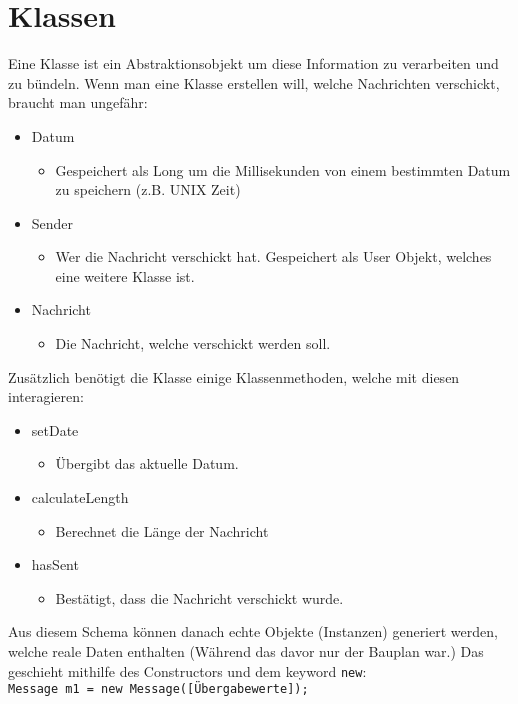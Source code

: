 \documentclass{article}
\begin{document}
	\section{Klassen}
	Eine Klasse ist ein Abstraktionsobjekt um diese Information zu verarbeiten und zu bündeln. Wenn man eine Klasse erstellen will, welche Nachrichten verschickt, braucht man ungefähr:
	\begin{itemize}
		\item{Datum}
		\begin{itemize}
			\item{Gespeichert als Long um die Millisekunden von einem bestimmten Datum zu speichern (z.B. UNIX Zeit)}
		\end{itemize}
		\item{Sender}
		\begin{itemize}
			\item{Wer die Nachricht verschickt hat. Gespeichert als User Objekt, welches eine weitere Klasse ist.}
		\end{itemize}
		\item{Nachricht}
		\begin{itemize}
			\item{Die Nachricht, welche verschickt werden soll.}
		\end{itemize}
	\end{itemize}
	Zusätzlich benötigt die Klasse einige Klassenmethoden, welche mit diesen interagieren:
	\begin{itemize}
		\item{setDate}
		\begin{itemize}
			\item{Übergibt das aktuelle Datum.}
		\end{itemize}
		\item{calculateLength}
		\begin{itemize}
			\item{Berechnet die Länge der Nachricht}
		\end{itemize}
		\item{hasSent}
		\begin{itemize}
			\item{Bestätigt, dass die Nachricht verschickt wurde.}
		\end{itemize}
	\end{itemize}
	Aus diesem Schema können danach echte Objekte (Instanzen) generiert werden, welche reale Daten enthalten (Während das davor nur der Bauplan war.) Das geschieht mithilfe des Constructors und dem keyword \texttt{new}: \\
	\texttt{Message m1 = new Message([Übergabewerte]);}
\end{document}
